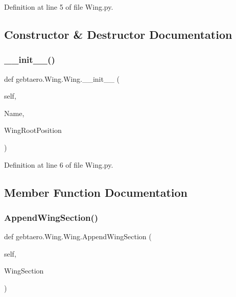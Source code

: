 Definition at line 5 of file Wing.\+py.



\subsection{Constructor \& Destructor Documentation}
\mbox{\label{classgebtaero_1_1_wing_1_1_wing_ad4899077f16bf8b8dff5e9ce86c4b2c0}} 
\subsubsection{\texorpdfstring{\+\_\+\+\_\+init\+\_\+\+\_\+()}{\_\_init\_\_()}}
{\footnotesize\ttfamily def gebtaero.\+Wing.\+Wing.\+\_\+\+\_\+init\+\_\+\+\_\+ (\begin{DoxyParamCaption}\item[{}]{self,  }\item[{}]{Name,  }\item[{}]{Wing\+Root\+Position }\end{DoxyParamCaption})}



Definition at line 6 of file Wing.\+py.



\subsection{Member Function Documentation}
\mbox{\label{classgebtaero_1_1_wing_1_1_wing_ae2bcf197a55c10900d837bc0d9d6aac7}} 
\subsubsection{\texorpdfstring{Append\+Wing\+Section()}{AppendWingSection()}}
{\footnotesize\ttfamily def gebtaero.\+Wing.\+Wing.\+Append\+Wing\+Section (\begin{DoxyParamCaption}\item[{}]{self,  }\item[{}]{Wing\+Section }\end{DoxyParamCaption})}



